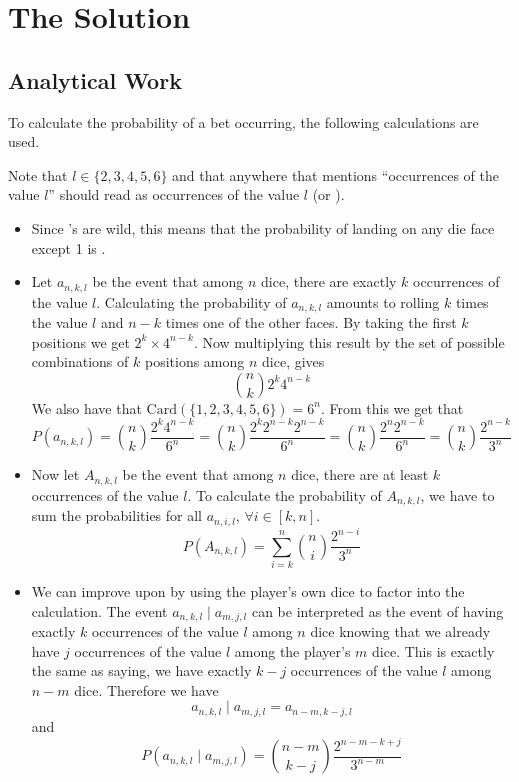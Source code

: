 \chapter{The Solution}

\section{Analytical Work}
\label{sec:prob}
To calculate the probability of a bet occurring, the following calculations are used.

Note that $l \in \{2, 3, 4, 5, 6\}$ and that anywhere that mentions ``occurrences of the value $l$'' should read as occurrences of the value $l$ (or {\Large{}}).
\begin{itemize}
    \item Since {\Large{}}'s are wild, this means that the probability of landing on any die face except 1 is .
    \item Let $a_{n, k, l}$ be the event that among $n$ dice, there are exactly $k$ occurrences of the value $l$. Calculating the probability of $a_{n, k, l}$ amounts to rolling $k$ times the value $l$ and $ n - k$ times one of the other faces. By taking the first $k$ positions we get $2^k \times 4^{n-k}$. Now multiplying this result by the set of possible combinations of $k$ positions among $n$ dice, gives
    \[
        \binom{n}{k}2^k4^{n - k}
    \]
    We also have that $\text{Card}(\{1,2,3,4,5,6\}) = 6^n$. From this we get that
    \begin{equation}
        \label{eq:prob_a}
        P(a_{n,k,l}) = \binom{n}{k}\frac{2^k4^{n-k}}{6^n} = \binom{n}{k}\frac{2^k2^{n-k}2^{n-k}}{6^n} = \binom{n}{k}\frac{2^n2^{n-k}}{6^n} = \binom{n}{k}\frac{2^{n-k}}{3^n}
    \end{equation}

    \item Now let $A_{n, k, l}$ be the event that among $n$ dice, there are at least $k$ occurrences of the value $l$. To calculate the probability of $A_{n,k,l}$, we have to sum the probabilities for all $a_{n, i, l}$, $\forall i \in [k, n]$.
    \begin{equation}
        \label{eq:prob_a1}
        P(A_{n,k,l}) = \sum_{i = k}^n\binom{n}{i}\frac{2^{n-i}}{3^n}
    \end{equation}
    \item We can improve upon  by using the player's own dice to factor into the calculation. The event $a_{n, k ,l} \mid a_{m, j, l}$ can be interpreted as the event of having exactly $k$ occurrences of the value $l$ among $n$ dice knowing that we already have $j$ occurrences of the value $l$ among the player's $m$ dice. This is exactly the same as saying, we have exactly $k - j$ occurrences of the value $l$ among $n - m$ dice. Therefore we have
    \[
        a_{n, k ,l} \mid a_{m, j, l} = a_{n - m, k - j, l}
    \]
    and
    \begin{equation}
        \label{eq:prob_b}
        P(a_{n, k ,l} \mid a_{m, j, l}) = \binom{n - m}{k - j}\frac{2^{n-m-k+j}}{3^{n-m}}
    \end{equation}


\end{itemize}
